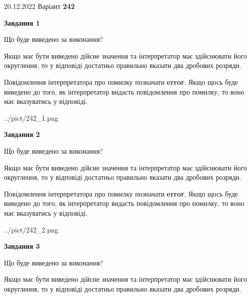 \documentclass[12pt, ukrainian]{article}
\begin{document}
{20.12.2022 Варіант \No \textbf { 242 }\par}
{
\begin {Large}

{\begin {center}\textbf{Завдання 1}\end {center}}\par
Що буде виведено за виконання? \par

Якщо має бути виведено дійсне значення та інтерпретатор має здійснювати його округлення, 
то у відповіді достатньо правильно вказати два дробових розряди.

Повідомлення інтерпретатора про помилку позначати \textbf{error}.
Якщо щось буде виведено до того, як інтерпретатор видасть повідомлення про помилку, 
то воно має вказуватись у відповіді. \par

\begin{center}
	{../pict/242_1.png}
\end{center}
\newpage

{\begin {center}\textbf{Завдання 2}\end {center}}\par
Що буде виведено за виконання? \par

Якщо має бути виведено дійсне значення та інтерпретатор має здійснювати його округлення, 
то у відповіді достатньо правильно вказати два дробових розряди.

Повідомлення інтерпретатора про помилку позначати \textbf{error}.
Якщо щось буде виведено до того, як інтерпретатор видасть повідомлення про помилку, 
то воно має вказуватись у відповіді. \par

\begin{center}
	{../pict/242_2.png}
\end{center}
\newpage

{\begin {center}\textbf{Завдання 3}\end {center}}\par
Що буде виведено за виконання? \par

Якщо має бути виведено дійсне значення та інтерпретатор має здійснювати його округлення, 
то у відповіді достатньо правильно вказати два дробових розряди.


\end{Large}}
\end{document}
